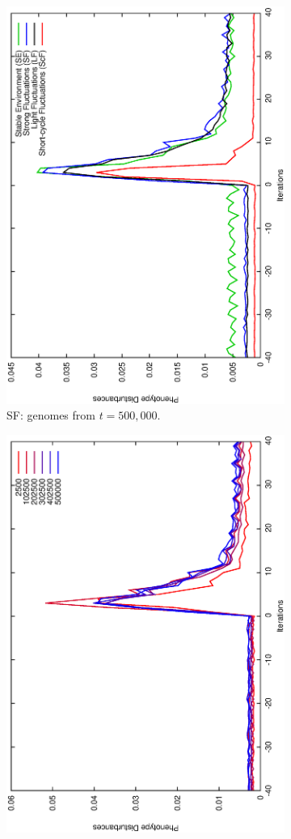 \begin{figure}[h]
\begin{subfigure}{.25\textwidth}
 \centering
 \includegraphics[width=.7\linewidth, angle =-90]{img/Sucavg499999variationb.eps}
 \caption{SF: genomes from $t\!=\!500,000$.}
 \label{fig:transst}
\end{subfigure}%
\begin{subfigure}{.25\textwidth}
 \centering
 \includegraphics[width=.7\linewidth, angle =-90]{img/SucavgvarValidvariationb.eps}

\end{subfigure}
\end{figure}
